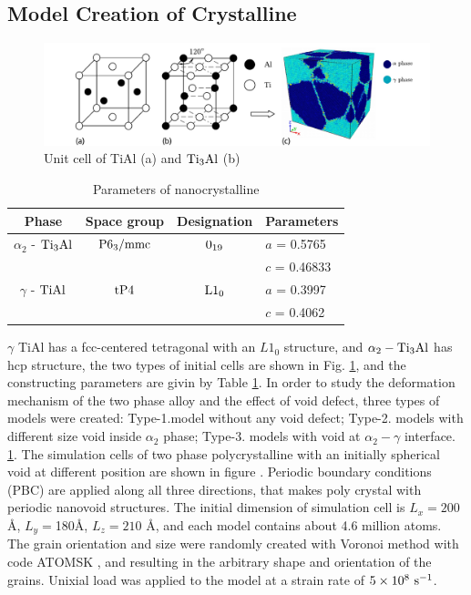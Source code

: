 \documentclass[metals,article,submit,moreauthors,pdftex,10pt,a4paper]{Definitions/mdpi}
\begin{document}
\subsection{Model Creation of Crystalline}
\begin{figure}[ht]
	\centering
	\includegraphics[width=1\linewidth]{img/tial-cell2}
	\caption{Unit cell of \rm{TiAl} (a) and $\rm{Ti_3Al}$ (b)}
	\label{fig:tial-cell}
\end{figure}

\begin{table}[ht]
	\caption{Parameters of nanocrystalline}
	\centering
	\begin{tabular}{c c c l}
	\toprule
	\textbf{Phase}			& {Space group}		& {Designation} 		& {Parameters} \\
	\midrule
	$\alpha_2$ - $\rm{Ti_3Al}$		& $\rm P6_3/mmc$ 	& $\rm 0_{19}$ 		& $a$ = 0.5765 \\
		&					&					& $c$ = 0.46833 \\
	$\gamma$ - $\rm{TiAl}$ 		& $\rm tP4$ 		& $\rm L1_0$		& $a$ = 0.3997 \\
		&					&					& $c$ = 0.4062 \\			
	\bottomrule
	\end{tabular} 
	\label{tab:lattice_parameter}
\end{table} 

$\gamma $ TiAl has a fcc-centered tetragonal with an $L1_0$ structure, and $\alpha_2 -\rm Ti_3Al$ has hcp structure, the two types of initial cells are shown in Fig. \ref{fig:tial-cell}, and the constructing parameters are givin by Table \ref{tab:lattice_parameter}. 
In order to study the deformation mechanism of the two phase alloy and the effect of void defect, three types of models were created: Type-1.model without any void defect; Type-2. models with different size void inside $\alpha_2$ phase; Type-3. models with void at $\alpha_2-\gamma$ interface. 
\ref{tab:lattice_parameter}. The simulation cells of two phase polycrystalline with an initially spherical void at different position are shown in figure . 
Periodic boundary conditions (PBC) are applied along all three directions, that makes poly crystal with periodic nanovoid structures. The initial dimension of simulation cell is $L_x =200$ \si{\angstrom}, $L_y = $180\si{\angstrom}, $L_z = 210$ \si{\angstrom}, and each model contains about 4.6 million atoms. The grain orientation and size were randomly created with Voronoi method with code ATOMSK \cite{Hirel2015}, and resulting in the arbitrary shape and orientation of the grains.
Unixial load was applied to the model at a strain rate of $5\times10^8\ \rm{s}^{-1}$.
 
\end{document}
